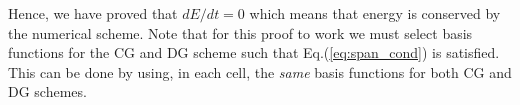 \documentclass[11pt, reqno]{amsart}
\newcommand{\eqr}[1]{Eq.\thinspace(#1)}
\theoremstyle{definition}
\begin{document}
Hence, we have proved that $dE/dt = 0$ which means that energy is
conserved by the numerical scheme. Note that for this proof to work we
must select basis functions for the CG and DG scheme such that
\eqr{\ref{eq:span_cond}} is satisfied. This can be done by using, in
each cell, the \emph{same} basis functions for both CG and DG schemes.
\end{document}
